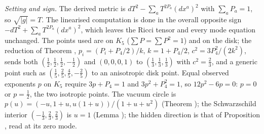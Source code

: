\emph{Setting and sign.} The derived metric is $dT^{2} - \sum_{a}T^{2P_{a}}(dx^{a})^{2}$ with $\sum_{a}P_{a} = 1$, so $\sqrt{|g|} = T$. The linearised computation is done in the overall opposite sign $-dT^{2} + \sum_{a}T^{2P_{a}}(dx^{a})^{2}$, which leaves the Ricci tensor and every mode equation unchanged. The points used are on $K_{5}$ ($\sum P = \sum P^{2} = 1$) and on the disk; the reduction of Theorem , $p_{i} = (P_{i} + P_{4}/2)/k$, $k = 1 + P_{4}/2$, $c^{2} = 3P_{4}^{2}/(2k^{2})$, sends both $(\tfrac12, \tfrac12, \tfrac12, -\tfrac12)$ and $(0, 0, 0, 1)$ to $(\tfrac13, \tfrac13, \tfrac13)$ with $c^{2} = \tfrac23$, and a generic point such as $(\tfrac15, \tfrac25, \tfrac45, -\tfrac25)$ to an anisotropic disk point. Equal observed exponents $p$ on $K_{5}$ require $3p + P_{4} = 1$ and $3p^{2} + P_{4}^{2} = 1$, so $12p^{2} - 6p = 0$: $p = 0$ or $p = \tfrac12$, the two isotropic points. The vacuum circle is $p(u) = (-u, 1 + u, u(1 + u))/(1 + u + u^{2})$ (Theorem ); the Schwarzschild interior $(-\tfrac13, \tfrac23, \tfrac23)$ is $u = 1$ (Lemma ); the hidden direction is that of Proposition , read at its zero mode.

